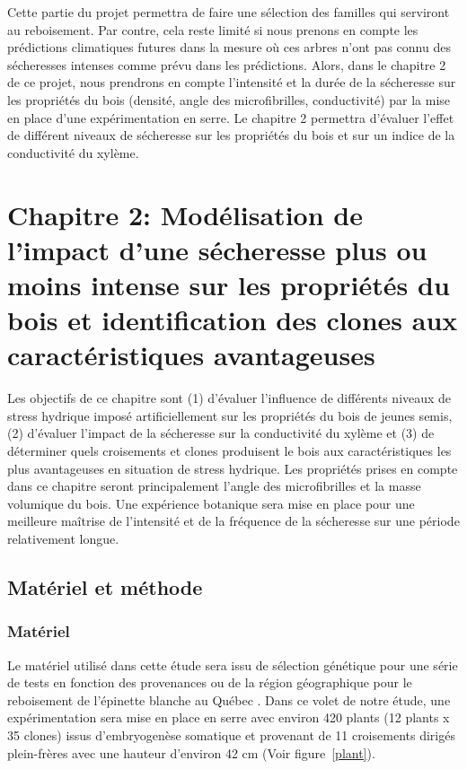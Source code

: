 \documentclass{report}
\begin{document}
Cette partie du projet permettra de faire une sélection des familles qui serviront au reboisement. Par contre, cela reste limité si nous prenons en compte les prédictions climatiques futures dans la mesure où ces arbres n'ont pas connu des sécheresses intenses comme prévu dans les prédictions. Alors, dans le chapitre 2 de ce projet, nous prendrons en compte l'intensité et la durée de la sécheresse sur les propriétés du bois (densité, angle des microfibrilles, conductivité) par la mise en place d'une expérimentation en serre. Le chapitre 2 permettra d'évaluer l'effet de différent niveaux de sécheresse sur les propriétés du bois et sur un indice de la conductivité du xylème.



\chapter{Chapitre 2: Modélisation de l'impact d'une sécheresse plus ou moins intense sur les propriétés du bois et identification des clones aux caractéristiques avantageuses}

Les objectifs de ce chapitre sont (1) d'évaluer l'influence de différents niveaux de stress hydrique imposé artificiellement sur les propriétés du bois de jeunes semis, (2) d'évaluer l'impact de la sécheresse sur la conductivité du xylème et (3) de déterminer quels croisements et clones produisent le bois aux caractéristiques les plus avantageuses en situation de stress hydrique. Les propriétés prises en compte dans ce chapitre seront principalement l'angle des microfibrilles et la masse volumique du bois. Une expérience botanique sera mise en place pour une meilleure maîtrise de l'intensité et de la fréquence de la sécheresse sur une période relativement longue.   


\section{Matériel et méthode}

\subsection*{Matériel}

Le matériel utilisé dans cette étude sera issu de sélection génétique pour une série de tests en fonction des provenances ou de la région géographique pour le reboisement de l'épinette blanche au Québec \citep{Beaulieu1996}. Dans ce volet de notre étude, une expérimentation sera mise en place en serre avec environ 420 plants (12 plants x 35 clones) issus d'embryogenèse somatique et provenant de 11 croisements dirigés plein-frères avec une hauteur d'environ 42 cm (Voir figure~\ref{plant}).  \\
\end{document}
